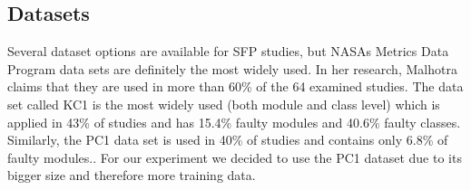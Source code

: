 \subsection{Datasets}
Several dataset options are available for SFP studies, but NASAs Metrics Data Program data sets are definitely the most widely used. In her research, Malhotra\cite{malhotra2015systematic} claims that they are used in more than 60\% of the 64 examined studies. The data set called KC1 is the most widely used (both module and class level) which is applied in 43\% of studies and
has 15.4\% faulty modules and 40.6\% faulty classes. Similarly, the PC1 data set is used in 40\% of studies and contains only 6.8\% of faulty modules.\cite[p.~17]{malhotra2015systematic}. For our experiment we decided to use the PC1 dataset due to its bigger size and therefore more training data. 